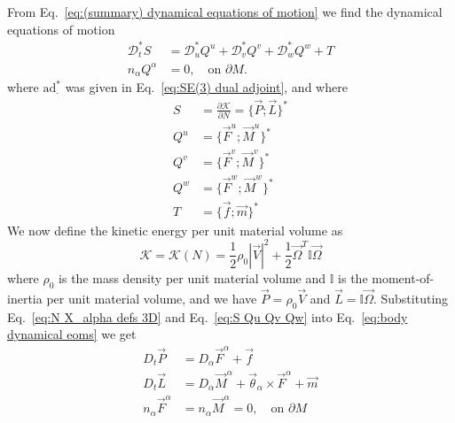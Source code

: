 From Eq.~\ref{eq:(summary) dynamical equations of motion} we find the dynamical equations of motion
\begin{subequations}  \label{eq:body dynamical eoms}
\begin{align}
\mathcal{D}^*_t S & = \mathcal{D}_u^* Q^u + \mathcal{D}_v^* Q^v + \mathcal{D}_w^* Q^w + T  \\
n_\alpha Q^\alpha & = 0, \quad \text{on } \partial M.
\end{align}
\end{subequations}
where $\text{ad}_{\cdot}^*$ was given in Eq.~\ref{eq:SE(3) dual adjoint}, and where
\begin{subequations} \label{eq:S Qu Qv Qw}
\begin{align}
S & = \frac{\partial \mathcal{K}}{\partial N} = \{ \vec{P} ; \vec{L} \}^* \\
Q^u & = \{ \vec{F}^u ; \vec{M}^u \}^* \\
Q^v & = \{ \vec{F}^v ; \vec{M}^v \}^* \\
Q^w & = \{ \vec{F}^w ; \vec{M}^w \}^* \\
T & = \{ \vec{f} ; \vec{m} \}^*
\end{align}
\end{subequations}
We now define the kinetic energy per unit material volume as
\begin{equation} \label{eq:KE of cosserat body}
\mathcal{K} = \mathcal{K}(N)  = \frac{1}{2} \rho_0 |\vec{V}|^2 +  \frac{1}{2} \vec{\Omega}^T \mathbb{I} \vec{\Omega}
\end{equation}
where $\rho_0$ is the mass density per unit material volume and $\mathbb{I}$ is the moment-of-inertia per unit material volume, and we have $\vec{P} = \rho_0 \vec{V}$ and $\vec{L} = \mathbb{I} \vec{\Omega}$. Substituting Eq.~\ref{eq:N X_alpha defs 3D} and Eq.~\ref{eq:S Qu Qv Qw} into Eq.~\ref{eq:body dynamical eoms} we get
\begin{subequations} \label{eq:cosserat body dynamic eoms}
\begin{align}
D_t \vec{P} & = D_\alpha \vec{F}^\alpha + \vec{f} \label{eq:body P eom} \\
D_t \vec{L} & = D_\alpha \vec{M}^\alpha + \vec{\theta}_\alpha \times \vec{F}^\alpha + \vec{m} \label{eq:body L eom} \\
n_\alpha \vec{F}^\alpha & = n_\alpha \vec{M}^\alpha = 0, \quad \text{on } \partial M 
\end{align}
\end{subequations}
